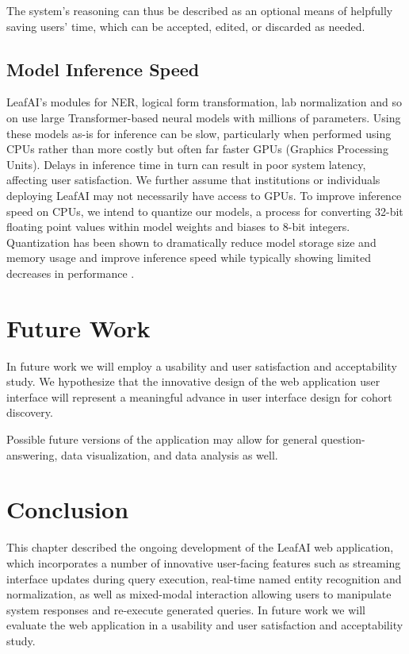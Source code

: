 \documentclass[../main.tex]{subfiles}
\begin{document}
The system's reasoning can thus be described as an optional means of helpfully saving users' time, which can be accepted, edited, or discarded as needed.

\subsection{Model Inference Speed}

LeafAI's modules for NER, logical form transformation, lab normalization and so on use large Transformer-based neural models \cite{vaswani2017attention} with millions of parameters. Using these models as-is for inference can be slow, particularly when performed using CPUs rather than more costly but often far faster GPUs (Graphics Processing Units). Delays in inference time in turn can result in poor system latency, affecting user satisfaction. We further assume that institutions or individuals deploying LeafAI may not necessarily have access to GPUs. To improve inference speed on CPUs, we intend to quantize our models, a process for converting 32-bit floating point values within model weights and biases to 8-bit integers. Quantization has been shown to dramatically reduce model storage size and memory usage and improve inference speed while typically showing limited decreases in performance \cite{hubara2017quantized}. 

\section{Future Work}

In future work we will employ a usability and user satisfaction and acceptability study. We hypothesize that the innovative design of the web application user interface will represent a meaningful advance in user interface design for cohort discovery.

Possible future versions of the application may allow for general question-answering, data visualization, and data analysis as well.

\section{Conclusion}

This chapter described the ongoing development of the LeafAI web application, which incorporates a number of innovative user-facing features such as streaming interface updates during query execution, real-time named entity recognition and normalization, as well as mixed-modal interaction allowing users to manipulate system responses and re-execute generated queries. In future work we will evaluate the web application in a usability and user satisfaction and acceptability study.
\end{document}
